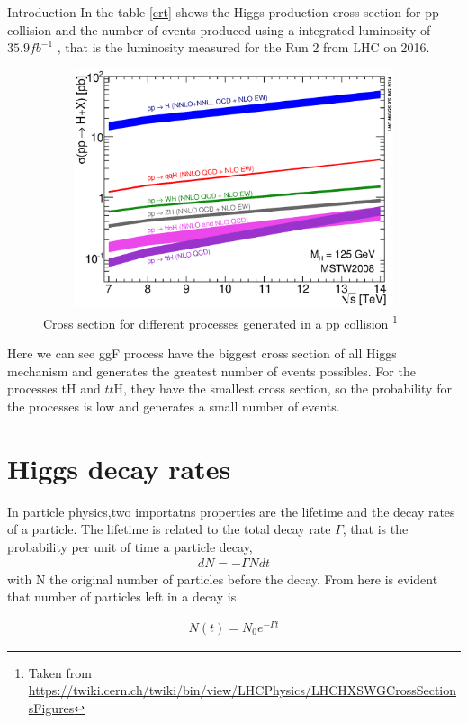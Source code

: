 \begin{chapter}{Introduction}
In the table \ref{crt} shows the Higgs production cross section for pp collision and the number of events produced using a integrated luminosity of $35.9 fb^{-1}$ , that is the luminosity measured for the Run 2 from LHC on 2016\cite{pd}.

\begin{figure}
\centering
\includegraphics[width=12cm,height=7cm]{Chapter1/7-14xsec.eps}
\caption{
Cross section for different processes generated in a pp collision \protect \footnote{Taken from \url{ https://twiki.cern.ch/twiki/bin/view/LHCPhysics/LHCHXSWGCrossSectionsFigures}}
} \label{csp}
\end{figure}

Here we can see ggF process have the biggest cross section of all Higgs mechanism and generates the greatest number of events possibles. For the processes tH and $t\bar{t}$H, they have the smallest cross section, so the probability for the processes is low and generates a small number of events. 
\pagebreak

\section{Higgs decay rates}
In particle physics,two importatns properties are the lifetime and the decay rates of a particle. The lifetime is related to the total decay rate $\Gamma$, that is the probability per unit of time a particle decay, 
\begin{align}
    dN=-\Gamma N dt
\end{align}
with N the original number of particles before the decay. From here is evident that number of particles left in a decay is 

\begin{align}
N(t)=N_0 e^{-\Gamma t}
\end{align}


\end{chapter}
